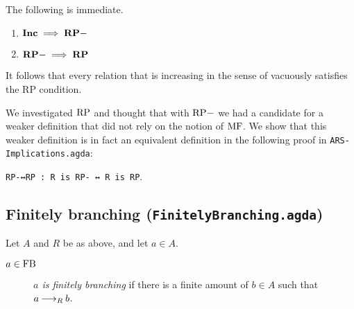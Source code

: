 The following is immediate.
\begin{proposition}\hfill 
    \begin{enumerate}
        \item $\mathbf{Inc} \implies \mathbf{RP-}$
        \item $\mathbf{RP-} \implies \mathbf{RP}$
    \end{enumerate}
\end{proposition}


It follows that every relation that is increasing in the sense of \terese
vacuously satisfies the RP condition.

We investigated $\mathrm{RP}$ and thought that with $\mathrm{RP-}$ we had a candidate for a weaker definition that 
did not rely on the notion of $\mathrm{MF}$. We show that this weaker definition is 
in fact an equivalent definition in the following proof in \texttt{ARS-Implications.agda}: 

\verb|RP-↔RP : R is RP- ↔ R is RP|. 

\subsection{Finitely branching (\texttt{FinitelyBranching.agda})}
\begin{definition} Let $A$ and $R$ be as above, and let $a \in A$.
    \begin{description}
        \item[$a \in \mathrm{FB}$] \emph{$a$ is finitely branching} if there is a finite amount of  $b \in A$ such that $a \mathbin{\longrightarrow_R} b$. 
    \end{description}
\end{definition}
